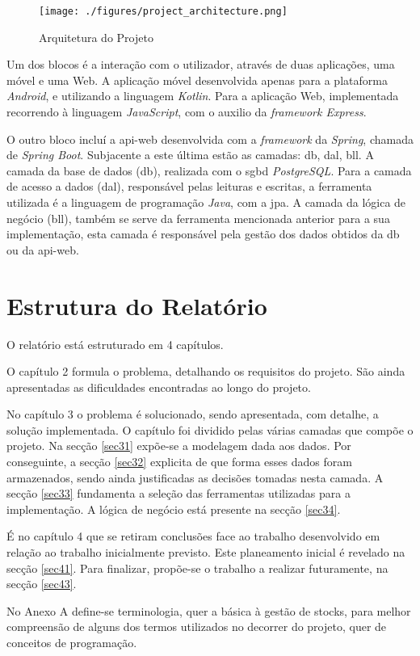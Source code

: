 \begin{figure}[H]
	\centering
	\texttt{[image: ./figures/project\_architecture.png]}
	\caption{Arquitetura do Projeto}
	\label{project-architecture}
\end{figure}

Um dos blocos é a interação com o utilizador, através de duas aplicações, uma móvel e uma Web. A aplicação móvel desenvolvida apenas para a plataforma \textit{Android}, e utilizando a linguagem \textit{Kotlin}. Para a aplicação Web, implementada recorrendo à linguagem \textit{JavaScript}, com o auxilio da \textit{framework Express}. 

O outro bloco incluí a \gls{api-web} desenvolvida com a \textit{framework} da \textit{Spring}, chamada de \textit{Spring Boot}. Subjacente a este última estão as camadas: \acrfull{db}, \acrfull{dal}, \acrfull{bll}.  A camada da base de dados (\acrshort{db}), realizada com o \acrfull{sgbd} \textit{PostgreSQL}. Para a camada de acesso a dados (\acrshort{dal}), responsável pelas leituras e escritas, a ferramenta utilizada é a linguagem de programação \textit{Java}, com a \acrfull{jpa}. A camada da lógica de negócio (\acrshort{bll}), também se serve da ferramenta mencionada anterior para a sua implementação, esta camada é responsável pela gestão dos dados obtidos da \acrshort{db} ou da \gls{api-web}.


%
%
\section{Estrutura do Relatório} \label{sec14}
O relatório está estruturado em 4 capítulos.

O capítulo 2 formula o problema, detalhando os requisitos do projeto. São ainda apresentadas as dificuldades encontradas ao longo do projeto. 

No capítulo 3 o problema é solucionado, sendo apresentada, com detalhe, a solução implementada. O capítulo foi dividido pelas várias camadas que compõe o projeto. Na secção \ref{sec31} expõe-se a modelagem dada aos dados. Por conseguinte, a secção \ref{sec32} explicita de que forma esses dados foram armazenados, sendo ainda justificadas as decisões tomadas nesta camada. A secção \ref{sec33} fundamenta a seleção das ferramentas utilizadas para a implementação. A lógica de negócio está presente na secção \ref{sec34}. 

É no capítulo 4 que se retiram conclusões face ao trabalho desenvolvido em relação ao trabalho inicialmente previsto. Este planeamento inicial é revelado na secção \ref{sec41}. Para finalizar, propõe-se o trabalho a realizar futuramente, na secção \ref{sec43}.

No Anexo A define-se terminologia, quer a básica à gestão de stocks, para melhor compreensão de alguns dos termos utilizados no decorrer do projeto, quer de conceitos de programação.

